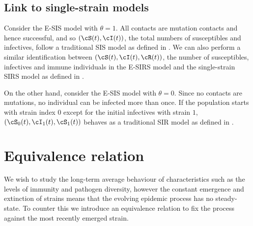 \documentclass[review]{elsarticle}
\begin{document}
\subsection{Link to single-strain models}\label{subsec: no evo}
Consider the E-SIS model with $\theta = 1$. All contacts are mutation contacts and hence successful, and so $(\cS(t),\cI(t))$, the total numbers of susceptibles and infectives, follow a traditional SIS model as defined in \cite{Andersson2000}. We can also perform a similar identification between $(\cS(t),\cI(t),\cR(t))$, the number of susceptibles, infectives and immune individuals in the E-SIRS model and the single-strain SIRS model as defined in \cite{nasell2002}.

On the other hand, consider the E-SIS model with $\theta = 0$. Since no contacts are mutations, no individual can be infected more than once. If the population starts with strain index $0$ except for the initial infectives with strain $1$, $(\cS_{0}(t), \cI_{1}(t), \cS_{1}(t))$ behaves as a traditional SIR model as defined in \cite{Andersson2000}. 
% 
% 

\section{Equivalence relation}\label{sec: equiv}
We wish to study the long-term average behaviour of characteristics such as the levels of immunity and pathogen diversity, however the constant emergence and extinction of strains means that the evolving epidemic process has no steady-state. To counter this we introduce an equivalence relation to fix the process against the most recently emerged strain. 
\end{document}
